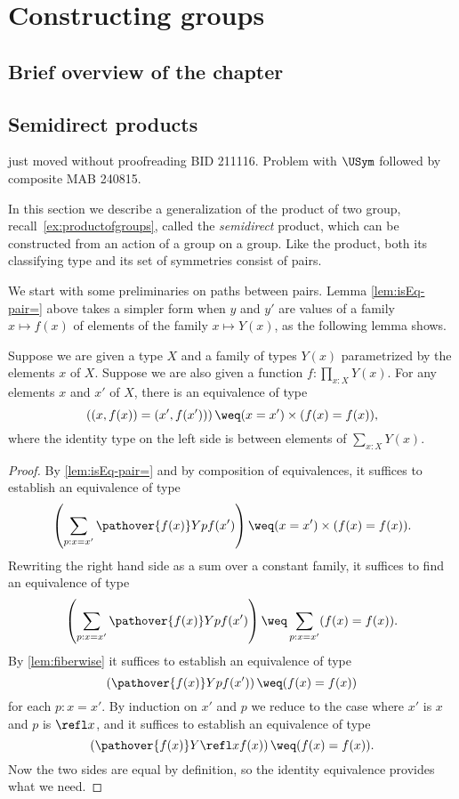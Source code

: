 \chapter{Constructing groups}
\label{ch:congp}

\section{Brief overview of the chapter}

\section{Semidirect products}
\label{sec:Semidirect-products}{\color{red} just moved without proofreading BID 211116. Problem with $\USym$ followed by composite MAB 240815.}

In this section we describe a generalization of the product of two group,
recall~\cref{ex:productofgroups},
called the \emph{semidirect} product, which can be constructed from an
action of a group on a group.  Like the product, both its classifying
type and its set of symmetries
consist of pairs.

We start with some preliminaries on paths between pairs.
Lemma \cref{lem:isEq-pair=} above takes a simpler form when $y$ and $y'$ are values of a family $x \mapsto f(x)$
of elements of the family $x \mapsto Y(x)$, as the following lemma shows.

\begin{lemma}\label{lem:pathpairsection}
  Suppose we are given a type $X$ and a family of types $Y(x)$ parametrized by the elements $x$ of $X$.
  Suppose we are also given a function $f : \prod_{x:X} Y(x)$.
  For any elements $x$ and $x'$ of $X$,
  there is an equivalence of type
  $$\left ( (x,f(x)) = (x',f(x')) \right ) \weq (x=x') \times (f(x) = f(x)),$$
  where the identity type on the left side is between elements of $\sum_{x:X} Y(x)$.
\end{lemma}

\begin{proof}
  By \cref{lem:isEq-pair=} and by composition of equivalences, it suffices to establish an equivalence of type
  $$\left( \sum_{p:x=x'} \pathover {f(x)} Y p {f(x')} \right) \weq (x=x') \times (f(x) = f(x)).$$
  Rewriting the right hand side as a sum over a constant family, it suffices to find an equivalence of type
  $$\left( \sum_{p:x=x'} \pathover {f(x)} Y p {f(x')} \right) \weq \sum_{p:x=x'} (f(x) = f(x)).$$
  By \cref{lem:fiberwise} it suffices to establish an equivalence of type
  $$ \left( \pathover {f(x)} Y p {f(x')} \right) \weq (f(x) = f(x))$$
  for each $p:x=x'$.  By induction on $x'$ and $p$ we reduce to the case where $x'$ is $x$ and $p$ is $\refl x$, and it suffices to establish an
  equivalence of type
  $$ \left( \pathover {f(x)} Y {\refl x} {f(x)} \right) \weq (f(x) = f(x)).$$
  Now the two sides are equal by definition, so the identity equivalence provides what we need.
\end{proof}

